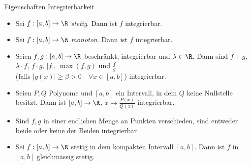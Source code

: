 \begin{theorem}{Eigenschaften Integrierbarkeit}
    \begin{itemize}
        \item Sei $f : [a,b] \to \R$ \textit{stetig}. Dann ist $f$ integrierbar.
        \item Sei $f: [a,b] \to \R$ \textit{monoton}. Dann ist $f$ integrierbar.
        \item Seien $f,g : [a,b] \to \R$ beschränkt, integrierbar und $\lambda \in \R$.
                Dann sind $f+g$, $\lambda \cdot f$, $f \cdot g$, $|f|$, $\max(f,g)$ und $\frac{f}{g}$ \\
                (falls $|g(x)| \geq \beta > 0 \quad \forall x \in [a,b]$) integrierbar.
        \item Seien $P,Q$ Polynome und $ [a,b]$ ein Intervall, in dem $Q$ keine Nullstelle besitzt. Dann ist $ [a,b] \to \R$, $x \mapsto \frac{P(x)}{Q(x)}$ integrierbar.
        \item Sind $f, g$ in einer endlichen Menge an Punkten verschieden, sind entweder beide oder keine der Beiden integrierbar
        \item Sei $f: [a,b] \to \R$ stetig in dem kompakten Intervall $ [a,b]$. Dann ist $f$ in $ [a,b]$ gleichmässig stetig.
    \end{itemize}
\end{theorem}



